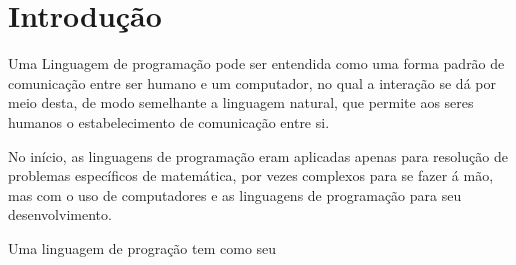 \chapter[Introdução]{Introdução}

Uma Linguagem de programação pode ser entendida como uma forma padrão de comunicação entre ser humano e um computador, no qual a interação se dá por meio desta, de modo semelhante a linguagem  natural, que permite aos seres humanos o estabelecimento de comunicação entre si.

No início, as linguagens de programação eram aplicadas apenas para resolução de problemas específicos de matemática, por vezes complexos para se fazer á mão, mas com o uso de computadores e as linguagens de programação para seu desenvolvimento.

Uma linguagem de progração tem como seu 
